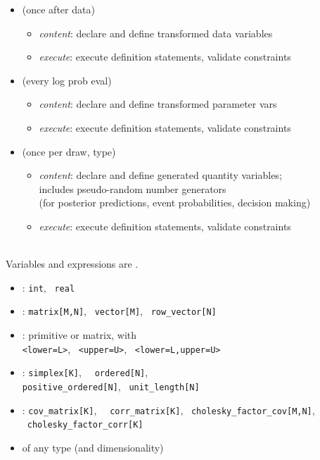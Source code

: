 \documentclass[10pt]{report}
\begin{document}
\begin{itemize}
\item {} (once after data)
  \vspace*{-4pt}
  \begin{itemize}\small
  \item {\slshape content}: declare and define transformed data variables
  \item {\slshape execute}: execute definition statements, validate constraints
  \end{itemize}
\item {} (every log prob eval)
  \vspace*{-4pt}
  \begin{itemize}\small
  \item {\slshape content}: declare and define transformed parameter vars
  \item {\slshape execute}: execute definition statements, validate constraints
  \end{itemize}
\item {} (once per draw, 
   type)
  \vspace*{-4pt}
  \begin{itemize}\small
  \item {\slshape content}: declare and define generated quantity
    variables; \\
    includes pseudo-random number generators
    \\
    {\footnotesize (for posterior predictions, event probabilities,
      decision making)}
  \item {\slshape execute}: execute definition statements, validate constraints
  \end{itemize}
\end{itemize}


\\[3pt]
\hspace*{17pt}Variables and expressions are .
\begin{itemize}
\item {}: {\tt\small int}, \ {\tt\small real}
\item {}: {\tt\small matrix[M,N]}, \ {\tt\small vector[M]}, \ {\tt\small row\_vector[N]}
\item {}: primitive or matrix, with 
  \\ {\tt\small <lower=L>}, \ {\tt\small <upper=U>}, \ {\tt\small <lower=L,upper=U>}
\item {}: {\tt\small simplex[K]}, \ {\tt\small
    ordered[N]},
  \\ {\tt\small positive\_ordered[N]}, \ {\tt\small unit\_length[N]}
\item {}: {\tt\small cov\_matrix[K]}, \ {\tt\small
    corr\_matrix[K]}, \ {\tt\small cholesky\_factor\_cov[M,N]}, \
  {\tt\small cholesky\_factor\_corr[K]}
\item {}  of any type (and dimensionality)
\end{itemize}
\end{document}
